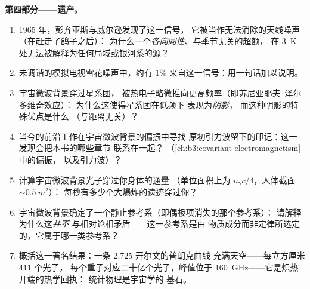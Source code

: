 \begin{problem}
\medskip\noindent\textbf{第四部分——遗产。}
\begin{enumerate}[resume]
  \item 1965 年，彭齐亚斯与威尔逊发现了这一信号，
        它被当作无法消除的天线噪声（在赶走了鸽子之后）：
        为什么一个\emph{各向同性}、与季节无关的超额，
        在 \qty{3}{K} 处无法被解释为任何局域或银河系的源？
  \item 未调谐的模拟电视雪花噪声中，约有 $1\%$
        来自这一信号：用一句话加以说明。
  \item 宇宙微波背景穿过星系团，
        被热电子略微推向更高频率（即苏尼亚耶夫–泽尔多维奇效应）：
        为什么这使得星系团在低频下
        表现为\emph{阴影}，
        而这种阴影的特殊优点是什么
        （与距离无关）？
  \item 当今的前沿工作在宇宙微波背景的偏振中寻找
        原初引力波留下的印记：这一发现会把本书的哪些章节
        联系在一起？
        （\cref{ch:b3:covariant-electromagnetism}中的偏振，
        以及引力波）？
  \item 计算宇宙微波背景光子穿过你身体的通量
        （单位面积上为 $n_\gamma c/4$，人体截面
        $\sim\qty{0.5}{m^2}$）：
        每秒有多少个大爆炸的遗迹穿过你？
  \item 宇宙微波背景确定了一个静止参考系（即偶极项消失的那个参考系）：
        请解释为什么这\emph{并不}
        与相对论相矛盾——这一参考系是由
        物质成分而非定律所选定的，它属于哪一类参考系？
  \item 概括这一著名结果：一条 $2.725$ 开尔文的普朗克曲线
        充满天空——每立方厘米 $411$ 个光子，
        每个重子对应二十亿个光子，峰值位于
        \qty{160}{GHz}——它是炽热开端的热学回执：
        统计物理是宇宙学的
        基石。
\end{enumerate}
\end{problem}
